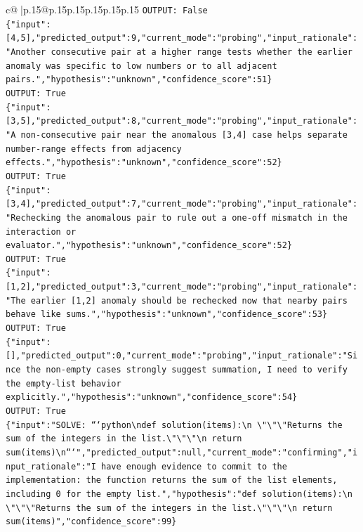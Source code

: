 \documentclass{article}
\begin{document}
{\begin{supertabular}{c@{$\;$}|p{.15\linewidth}@{}p{.15\linewidth}p{.15\linewidth}p{.15\linewidth}p{.15\linewidth}p{.15\linewidth}}
{{{\texttt{OUTPUT: False} \\
\texttt{\{"input":{[}4,5{]},"predicted\_output":9,"current\_mode":"probing","input\_rationale":"Another consecutive pair at a higher range tests whether the earlier anomaly was specific to low numbers or to all adjacent pairs.","hypothesis":"unknown","confidence\_score":51\}} \\
\texttt{OUTPUT: True} \\
\texttt{\{"input":{[}3,5{]},"predicted\_output":8,"current\_mode":"probing","input\_rationale":"A non{-}consecutive pair near the anomalous {[}3,4{]} case helps separate number{-}range effects from adjacency effects.","hypothesis":"unknown","confidence\_score":52\}} \\
\texttt{OUTPUT: True} \\
\texttt{\{"input":{[}3,4{]},"predicted\_output":7,"current\_mode":"probing","input\_rationale":"Rechecking the anomalous pair to rule out a one{-}off mismatch in the interaction or evaluator.","hypothesis":"unknown","confidence\_score":52\}} \\
\texttt{OUTPUT: True} \\
\texttt{\{"input":{[}1,2{]},"predicted\_output":3,"current\_mode":"probing","input\_rationale":"The earlier {[}1,2{]} anomaly should be rechecked now that nearby pairs behave like sums.","hypothesis":"unknown","confidence\_score":53\}} \\
\texttt{OUTPUT: True} \\
\texttt{\{"input":{[}{]},"predicted\_output":0,"current\_mode":"probing","input\_rationale":"Since the non{-}empty cases strongly suggest summation, I need to verify the empty{-}list behavior explicitly.","hypothesis":"unknown","confidence\_score":54\}} \\
\texttt{OUTPUT: True} \\
\texttt{\{"input":"SOLVE: ```python\textbackslash{}ndef solution(items):\textbackslash{}n    \textbackslash{}"\textbackslash{}"\textbackslash{}"Returns the sum of the integers in the list.\textbackslash{}"\textbackslash{}"\textbackslash{}"\textbackslash{}n    return sum(items)\textbackslash{}n```","predicted\_output":null,"current\_mode":"confirming","input\_rationale":"I have enough evidence to commit to the implementation: the function returns the sum of the list elements, including 0 for the empty list.","hypothesis":"def solution(items):\textbackslash{}n    \textbackslash{}"\textbackslash{}"\textbackslash{}"Returns the sum of the integers in the list.\textbackslash{}"\textbackslash{}"\textbackslash{}"\textbackslash{}n    return sum(items)","confidence\_score":99\}} \\
}}}
\end{supertabular}}
\end{document}
